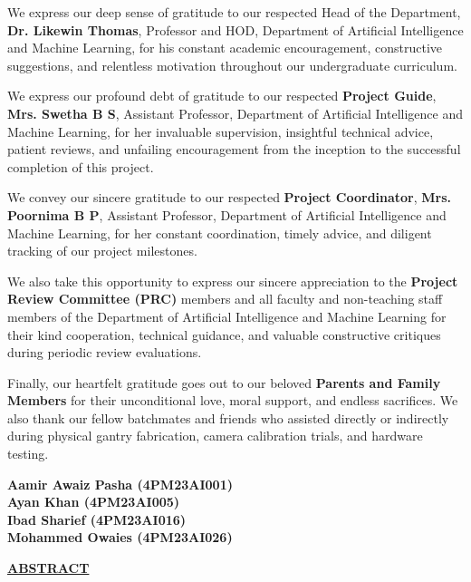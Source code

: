 \noindent We express our deep sense of gratitude to our respected Head of the Department, \textbf{Dr. Likewin Thomas}, Professor and HOD, Department of Artificial Intelligence and Machine Learning, for his constant academic encouragement, constructive suggestions, and relentless motivation throughout our undergraduate curriculum.

\noindent We express our profound debt of gratitude to our respected \textbf{Project Guide}, \textbf{Mrs. Swetha B S}, Assistant Professor, Department of Artificial Intelligence and Machine Learning, for her invaluable supervision, insightful technical advice, patient reviews, and unfailing encouragement from the inception to the successful completion of this project.

\noindent We convey our sincere gratitude to our respected \textbf{Project Coordinator}, \textbf{Mrs. Poornima B P}, Assistant Professor, Department of Artificial Intelligence and Machine Learning, for her constant coordination, timely advice, and diligent tracking of our project milestones.

\noindent We also take this opportunity to express our sincere appreciation to the \textbf{Project Review Committee (PRC)} members and all faculty and non-teaching staff members of the Department of Artificial Intelligence and Machine Learning for their kind cooperation, technical guidance, and valuable constructive critiques during periodic review evaluations.

\noindent Finally, our heartfelt gratitude goes out to our beloved \textbf{Parents and Family Members} for their unconditional love, moral support, and endless sacrifices. We also thank our fellow batchmates and friends who assisted directly or indirectly during physical gantry fabrication, camera calibration trials, and hardware testing.

\vspace{0.8cm}
\noindent
\begin{flushright}
    \textbf{Aamir Awaiz Pasha (4PM23AI001)}\\
    \textbf{Ayan Khan (4PM23AI005)}\\
    \textbf{Ibad Sharief (4PM23AI016)}\\
    \textbf{Mohammed Owaies (4PM23AI026)}\\
\end{flushright}

\newpage
\thispagestyle{frontmatterstyle}
\begin{center}
    {\Large \textbf{\underline{ABSTRACT}}}\\[0.4cm]
\end{center}

